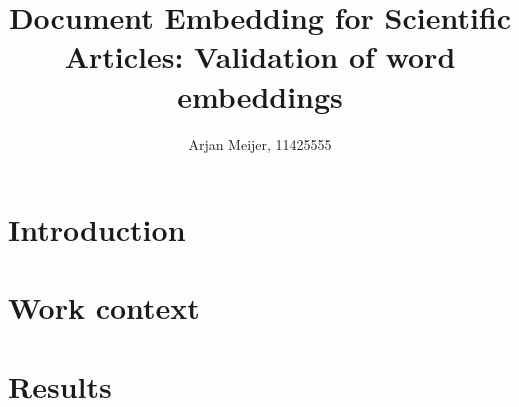 \documentclass[10pt,a4paper]{article}
\begin{document}
\begin{titlepage}
\title{Document Embedding for Scientific Articles: Validation of word embeddings}
\author{Arjan Meijer, 11425555}
\clearpage\maketitle\thispagestyle{empty}

\end{titlepage}

\section{Introduction}



\clearpage
\section{Work context}


\section{Results}



\clearpage




\end{document}
